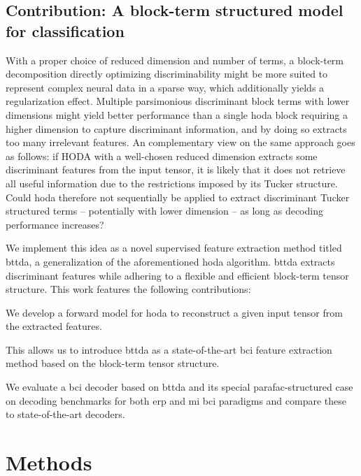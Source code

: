 \documentclass[twocolumn]{article}
\begin{document}
\subsection{Contribution: A block-term structured model for classification}

With a proper choice of reduced dimension and number of terms, a
block-term decomposition directly optimizing discriminability might be more
suited to represent complex neural data in a sparse way, which additionally
yields a regularization effect.
Multiple parsimonious discriminant block terms with lower
dimensions might yield better performance than a single \ac{hoda} block
requiring a higher dimension to capture discriminant information, and by doing
so extracts too many irrelevant features.
An complementary view on the same approach goes as follows:
if HODA with a well-chosen reduced dimension extracts some discriminant features
from the input tensor, it is likely that it does not retrieve all useful
information due to the restrictions imposed by its Tucker structure.
Could \ac{hoda} therefore not sequentially be applied to extract discriminant
Tucker structured terms -- potentially with lower dimension -- as long as decoding
performance increases?

We implement this idea as a novel supervised feature
extraction method titled \ac{bttda}, a generalization of the aforementioned
\ac{hoda} algorithm.
\Ac{bttda} extracts discriminant features while adhering to a
flexible and efficient block-term tensor structure.
This work features the following contributions:
\begin{enumerate*}[label={\arabic*)}]
	\item We develop a forward model for \ac{hoda} to reconstruct a
	      given input tensor from the extracted features.
	\item This allows us to introduce \ac{bttda} as a state-of-the-art \ac{bci}
	      feature extraction method based on the block-term tensor structure.
	\item We evaluate a \ac{bci} decoder based on \ac{bttda} and its special
	      \ac{parafac}-structured case on decoding benchmarks for both \ac{erp}
	      and \ac{mi}
	      \ac{bci} paradigms and compare these to state-of-the-art decoders.
\end{enumerate*}

\section{Methods}
\end{document}
